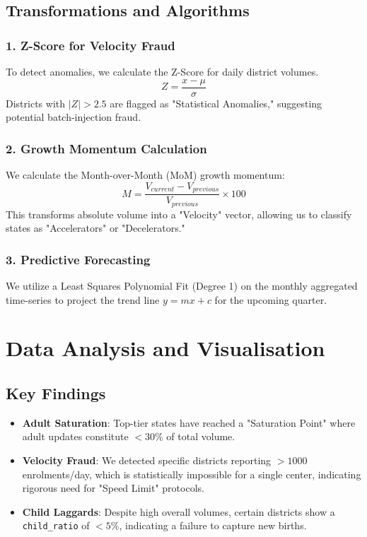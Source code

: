 \documentclass[12pt, a4paper]{article}
\begin{document}
\subsection{Transformations and Algorithms}
\subsubsection{1. Z-Score for Velocity Fraud}
To detect anomalies, we calculate the Z-Score for daily district volumes.
\[ Z = \frac{x - \mu}{\sigma} \]
Districts with $|Z| > 2.5$ are flagged as "Statistical Anomalies," suggesting potential batch-injection fraud.

\subsubsection{2. Growth Momentum Calculation}
We calculate the Month-over-Month (MoM) growth momentum:
\[ M = \frac{V_{current} - V_{previous}}{V_{previous}} \times 100 \]
This transforms absolute volume into a "Velocity" vector, allowing us to classify states as "Accelerators" or "Decelerators."

\subsubsection{3. Predictive Forecasting}
We utilize a Least Squares Polynomial Fit (Degree 1) on the monthly aggregated time-series to project the trend line $y = mx + c$ for the upcoming quarter.

\newpage
\section{Data Analysis and Visualisation}

\subsection{Key Findings}
\begin{itemize}
    \item \textbf{Adult Saturation}: Top-tier states have reached a "Saturation Point" where adult updates constitute $<30\%$ of total volume.
    \item \textbf{Velocity Fraud}: We detected specific districts reporting $>1000$ enrolments/day, which is statistically impossible for a single center, indicating rigorous need for "Speed Limit" protocols.
    \item \textbf{Child Laggards}: Despite high overall volumes, certain districts show a \texttt{child\_ratio} of $<5\%$, indicating a failure to capture new births.
\end{itemize}
\end{document}
